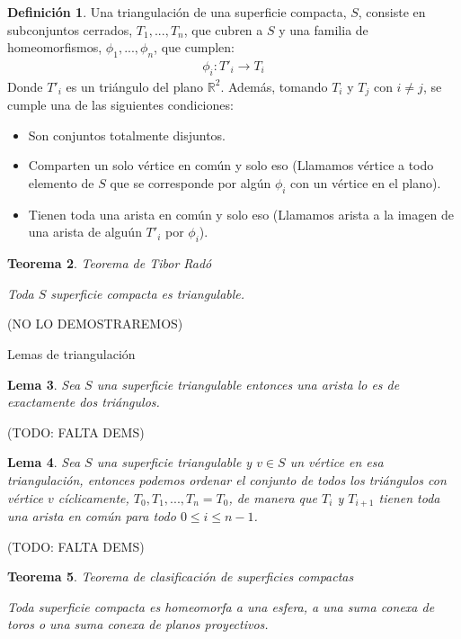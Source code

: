 \documentclass[a4paper,11pt,spanish, twoside, leqno]{tfg-uam}
\newtheorem{teor}{Teorema}[chapter]
\newtheorem{lema}[teor]{Lema}
\theoremstyle{definition}
\newtheorem{defin}[teor]{Definici\'on}
\begin{document}
\begin{defin}\label{defin:triangulacion}
	Una triangulación de una superficie compacta, $S$, consiste en subconjuntos cerrados, ${T_1, ..., T_n}$, que cubren a $S$ y una familia de homeomorfismos, ${\phi_1, ..., \phi_n}$, que cumplen:
	\begin{align*}
	\phi_i: T'_i \longrightarrow T_i
	\end{align*}
	Donde $T'_i$ es un triángulo del plano $\mathbb{R}^2$. Además, tomando $T_i$ y $T_j$ con $i\neq j$, se cumple una de las siguientes condiciones:
	\begin{itemize}
		\item 
		Son conjuntos totalmente disjuntos.
		\item 
		Comparten un solo vértice en común y solo eso (Llamamos vértice a todo elemento de $S$ que se corresponde por algún $\phi_i$ con un vértice en el plano).
		\item 
		Tienen toda una arista en común y solo eso (Llamamos arista a la imagen de una arista de alguún $T'_i$ por $\phi_i$).
	\end{itemize}
\end{defin}


\begin{teor}{Teorema de Tibor Radó}\label{teor:teoremaDeTriangulacion}
	
	Toda $S$ superficie compacta es triangulable.
\end{teor}(NO LO DEMOSTRAREMOS)




Lemas de triangulación
\begin{lema}\label{lema:lema1detriangulacion}
	Sea $S$ una superficie triangulable entonces una arista lo es de exactamente dos triángulos.
\end{lema}(TODO: FALTA DEMS)

\begin{lema}\label{lema:lema2detriangulacion}
	Sea  $S$ una superficie triangulable y $v\in S$ un vértice en esa triangulación, entonces podemos ordenar el conjunto de todos los triángulos con vértice $v$ cíclicamente,  $T_0, T_1, ..., T_n = T_0$, de manera que $T_i$ y $T_{i+1}$ tienen toda una arista en común para todo $0\leq i\leq n-1$.
\end{lema}(TODO: FALTA DEMS)


\begin{teor}{Teorema de clasificación de superficies compactas}\label{teor:teoremadeclasificacion}
	
	Toda superficie compacta es homeomorfa a una esfera, a una suma conexa de toros o una suma conexa de planos proyectivos.
\end{teor}
\end{document}

